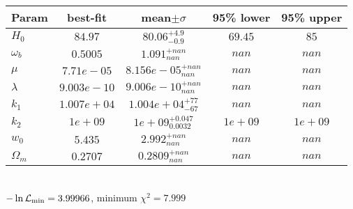\begin{tabular}{|l|c|c|c|c|} 
 \hline 
Param & best-fit & mean$\pm\sigma$ & 95\% lower & 95\% upper \\ \hline 
$H_{0 }$ &$84.97$ & $80.06_{-0.9}^{+4.9}$ & $69.45$ & $85$ \\ 
$\omega_b$ &$0.5005$ & $1.091_{nan}^{+nan}$ & $nan$ & $nan$ \\ 
$\mu$ &$7.71e-05$ & $8.156e-05_{nan}^{+nan}$ & $nan$ & $nan$ \\ 
$\lambda$ &$9.003e-10$ & $9.006e-10_{nan}^{+nan}$ & $nan$ & $nan$ \\ 
$k_{1 }$ &$1.007e+04$ & $1.004e+04_{-67}^{+77}$ & $nan$ & $nan$ \\ 
$k_{2 }$ &$1e+09$ & $1e+09_{0.0032}^{+0.047}$ & $1e+09$ & $1e+09$ \\ 
$w_{0 }$ &$5.435$ & $2.992_{nan}^{+nan}$ & $nan$ & $nan$ \\ 
$\Omega_{m }$ &$0.2707$ & $0.2809_{nan}^{+nan}$ & $nan$ & $nan$ \\ 
\hline 
 \end{tabular} \\ 
$-\ln{\cal L}_\mathrm{min} =3.99966$, minimum $\chi^2=7.999$ \\ 
